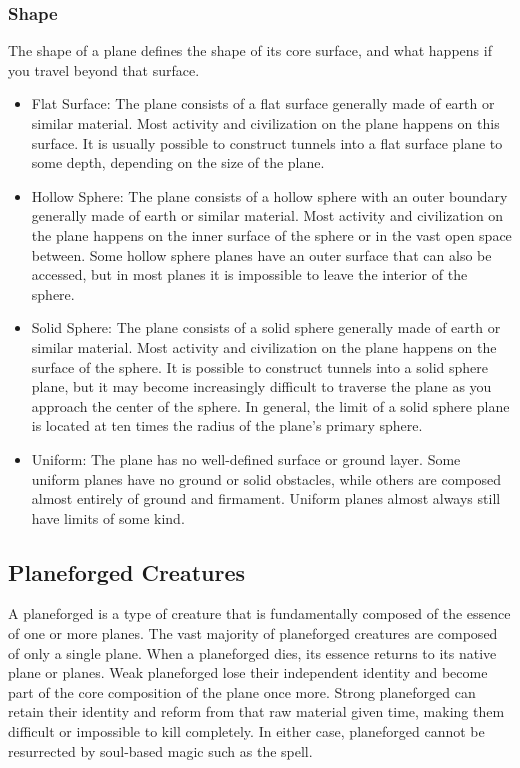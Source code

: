        \subsubsection{Shape} The shape of a plane defines the shape of its core surface, and what happens if you travel beyond that surface.

            \begin{itemize}
                \item Flat Surface: The plane consists of a flat surface generally made of earth or similar material.
                    Most activity and civilization on the plane happens on this surface.
                    It is usually possible to construct tunnels into a flat surface plane to some depth, depending on the size of the plane.
                \item Hollow Sphere: The plane consists of a hollow sphere with an outer boundary generally made of earth or similar material.
                    Most activity and civilization on the plane happens on the inner surface of the sphere or in the vast open space between.
                    Some hollow sphere planes have an outer surface that can also be accessed, but in most planes it is impossible to leave the interior of the sphere.
                \item Solid Sphere: The plane consists of a solid sphere generally made of earth or similar material.
                    Most activity and civilization on the plane happens on the surface of the sphere.
                    It is possible to construct tunnels into a solid sphere plane, but it may become increasingly difficult to traverse the plane as you approach the center of the sphere.
                    In general, the limit of a solid sphere plane is located at ten times the radius of the plane's primary sphere.
                \item Uniform: The plane has no well-defined surface or ground layer.
                    Some uniform planes have no ground or solid obstacles, while others are composed almost entirely of ground and firmament.
                    Uniform planes almost always still have limits of some kind.
            \end{itemize}

    \subsection{Planeforged Creatures}
        A planeforged is a type of creature that is fundamentally composed of the essence of one or more planes.
        The vast majority of planeforged creatures are composed of only a single plane.
        When a planeforged dies, its essence returns to its native plane or planes.
        Weak planeforged lose their independent identity and become part of the core composition of the plane once more.
        Strong planeforged can retain their identity and reform from that raw material given time, making them difficult or impossible to kill completely.
        In either case, planeforged cannot be resurrected by soul-based magic such as the  spell.

